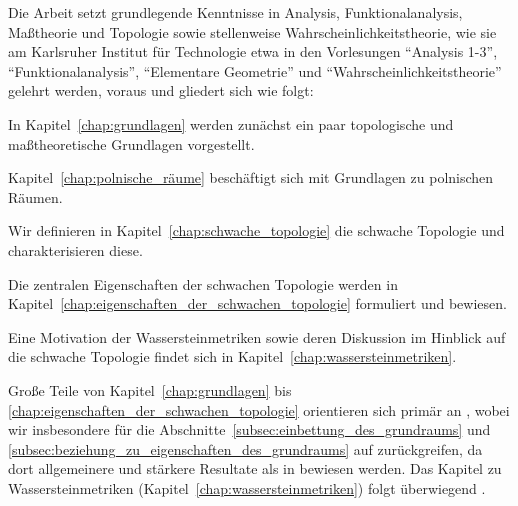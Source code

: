 \documentclass[../thesis/thesis.tex]{subfiles}
\begin{document}
	Die Arbeit setzt grundlegende Kenntnisse in Analysis, Funktionalanalysis, Maßtheorie und Topologie sowie stellenweise Wahrscheinlichkeitstheorie, wie sie am Karlsruher 
	Institut für Technologie etwa in den Vorlesungen
	\enquote{Analysis 1-3}, \enquote{Funktionalanalysis}, \enquote{Elementare Geometrie} und \enquote{Wahrscheinlichkeitstheorie} gelehrt werden, voraus und gliedert sich wie folgt:
	\begin{itemizethm}
		\item In Kapitel~\ref{chap:grundlagen} werden zunächst ein paar topologische und maßtheoretische Grundlagen vorgestellt.
		\item Kapitel~\ref{chap:polnische_räume} beschäftigt sich mit Grundlagen zu polnischen Räumen.
		\item Wir definieren in Kapitel~\ref{chap:schwache_topologie} die schwache Topologie und charakterisieren diese.
		\item Die zentralen Eigenschaften der schwachen Topologie werden in Kapitel~\ref{chap:eigenschaften_der_schwachen_topologie}
		formuliert und bewiesen.
		\item Eine Motivation der Wassersteinmetriken sowie deren Diskussion im Hinblick auf die schwache Topologie findet sich in Kapitel~\ref{chap:wassersteinmetriken}.
	\end{itemizethm}

	Große Teile von Kapitel~\ref{chap:grundlagen} bis \ref{chap:eigenschaften_der_schwachen_topologie} orientieren sich primär an \cite[Section 4.14]{Simon.2015}, 
	wobei wir insbesondere für die Abschnitte~\ref{subsec:einbettung_des_grundraums} und \ref{subsec:beziehung_zu_eigenschaften_des_grundraums} auf \cite{Varadarajan.1958}
	zurückgreifen, da dort allgemeinere und stärkere Resultate als in \cite{Simon.2015} bewiesen werden. Das Kapitel zu Wassersteinmetriken (Kapitel~\ref{chap:wassersteinmetriken})
	folgt überwiegend \cite[Chapter 4--6]{Villani.2009}.
	
\end{document}
